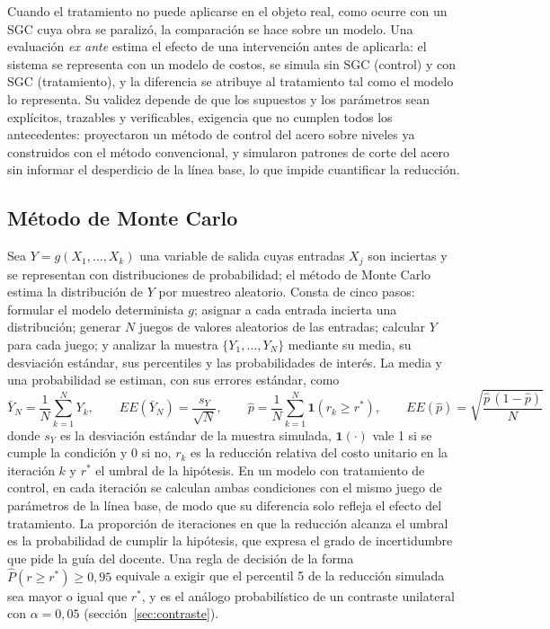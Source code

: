 Cuando el tratamiento no puede aplicarse en el objeto real, como ocurre con un SGC cuya obra se paralizó, la comparación se hace sobre un modelo. Una evaluación \emph{ex ante} estima el efecto de una intervención antes de aplicarla: el sistema se representa con un modelo de costos, se simula sin SGC (control) y con SGC (tratamiento), y la diferencia se atribuye al tratamiento tal como el modelo lo representa. Su validez depende de que los supuestos y los parámetros sean explícitos, trazables y verificables, exigencia que no cumplen todos los antecedentes: \textcite[p.~148]{chino2024} proyectaron un método de control del acero sobre niveles ya construidos con el método convencional, y \textcite[pp.~23--24, 51--52]{delavega2023} simularon patrones de corte del acero sin informar el desperdicio de la línea base, lo que impide cuantificar la reducción.

\subsection{Método de Monte Carlo}

Sea $Y = g(X_1, \dots, X_k)$ una variable de salida cuyas entradas $X_j$ son inciertas y se representan con distribuciones de probabilidad; el método de Monte Carlo estima la distribución de $Y$ por muestreo aleatorio. Consta de cinco pasos: formular el modelo determinista $g$; asignar a cada entrada incierta una distribución; generar $N$ juegos de valores aleatorios de las entradas; calcular $Y$ para cada juego; y analizar la muestra $\{Y_1, \dots, Y_N\}$ mediante su media, su desviación estándar, sus percentiles y las probabilidades de interés. La media y una probabilidad se estiman, con sus errores estándar, como
\begin{equation}
  \bar{Y}_N = \frac{1}{N}\sum_{k=1}^{N} Y_k, \qquad EE\!\left(\bar{Y}_N\right) = \frac{s_Y}{\sqrt{N}}, \qquad
  \hat{p} = \frac{1}{N}\sum_{k=1}^{N} \mathbf{1}\!\left(r_k \geq r^{*}\right), \qquad EE\!\left(\hat{p}\right) = \sqrt{\frac{\hat{p}\,(1-\hat{p})}{N}}
  \label{eq:montecarlo}
\end{equation}
donde $s_Y$ es la desviación estándar de la muestra simulada, $\mathbf{1}(\cdot)$ vale 1 si se cumple la condición y 0 si no, $r_k$ es la reducción relativa del costo unitario en la iteración $k$ y $r^{*}$ el umbral de la hipótesis. En un modelo con tratamiento de control, en cada iteración se calculan ambas condiciones con el mismo juego de parámetros de la línea base, de modo que su diferencia solo refleja el efecto del tratamiento. La proporción de iteraciones en que la reducción alcanza el umbral es la probabilidad de cumplir la hipótesis, que expresa el grado de incertidumbre que pide la guía del docente. Una regla de decisión de la forma $\hat{P}(r \geq r^{*}) \geq 0{,}95$ equivale a exigir que el percentil 5 de la reducción simulada sea mayor o igual que $r^{*}$, y es el análogo probabilístico de un contraste unilateral con $\alpha = 0{,}05$ (sección~\ref{sec:contraste}).

